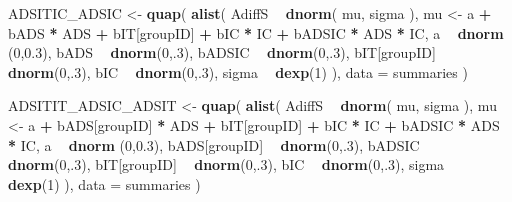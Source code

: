 \documentclass[10pt,dvipsnames,enabledeprecatedfontcommands]{scrartcl}
\newenvironment{Shaded}{\begin{snugshade}}{\end{snugshade}}
\newcommand{\KeywordTok}[1]{\textcolor[rgb]{0.13,0.29,0.53}{\textbf{#1}}}
\newcommand{\DataTypeTok}[1]{\textcolor[rgb]{0.13,0.29,0.53}{#1}}
\newcommand{\DecValTok}[1]{\textcolor[rgb]{0.00,0.00,0.81}{#1}}
\newcommand{\FloatTok}[1]{\textcolor[rgb]{0.00,0.00,0.81}{#1}}
\newcommand{\StringTok}[1]{\textcolor[rgb]{0.31,0.60,0.02}{#1}}
\newcommand{\OperatorTok}[1]{\textcolor[rgb]{0.81,0.36,0.00}{\textbf{#1}}}
\newcommand{\NormalTok}[1]{#1}
\begin{document}
\begin{Shaded}
\begin{Highlighting}[]
\NormalTok{ADSITIC_ADSIC <-}\StringTok{ }\KeywordTok{quap}\NormalTok{(}
  \KeywordTok{alist}\NormalTok{(}
\NormalTok{    AdiffS }\OperatorTok{~}\StringTok{ }\KeywordTok{dnorm}\NormalTok{( mu, sigma ),}
\NormalTok{    mu <-}\StringTok{ }\NormalTok{a }\OperatorTok{+}\StringTok{ }\NormalTok{bADS }\OperatorTok{*}\StringTok{ }\NormalTok{ADS }\OperatorTok{+}\StringTok{  }\NormalTok{bIT[groupID] }\OperatorTok{+}\StringTok{ }\NormalTok{bIC }\OperatorTok{*}\StringTok{ }\NormalTok{IC }\OperatorTok{+}\StringTok{ }\NormalTok{bADSIC }\OperatorTok{*}\StringTok{ }\NormalTok{ADS }\OperatorTok{*}\StringTok{ }\NormalTok{IC,}
\NormalTok{    a }\OperatorTok{~}\StringTok{ }\KeywordTok{dnorm}\NormalTok{ (}\DecValTok{0}\NormalTok{,}\FloatTok{0.3}\NormalTok{),}
\NormalTok{    bADS }\OperatorTok{~}\StringTok{ }\KeywordTok{dnorm}\NormalTok{(}\DecValTok{0}\NormalTok{,.}\DecValTok{3}\NormalTok{),}
\NormalTok{    bADSIC }\OperatorTok{~}\StringTok{ }\KeywordTok{dnorm}\NormalTok{(}\DecValTok{0}\NormalTok{,.}\DecValTok{3}\NormalTok{),}
\NormalTok{    bIT[groupID] }\OperatorTok{~}\StringTok{ }\KeywordTok{dnorm}\NormalTok{(}\DecValTok{0}\NormalTok{,.}\DecValTok{3}\NormalTok{),}
\NormalTok{    bIC }\OperatorTok{~}\StringTok{ }\KeywordTok{dnorm}\NormalTok{(}\DecValTok{0}\NormalTok{,.}\DecValTok{3}\NormalTok{),}
\NormalTok{    sigma  }\OperatorTok{~}\StringTok{ }\KeywordTok{dexp}\NormalTok{(}\DecValTok{1}\NormalTok{)}
\NormalTok{  ), }
  \DataTypeTok{data =}\NormalTok{ summaries}
\NormalTok{)}


\NormalTok{ADSITIT_ADSIC_ADSIT <-}\StringTok{ }\KeywordTok{quap}\NormalTok{(}
  \KeywordTok{alist}\NormalTok{(}
\NormalTok{    AdiffS }\OperatorTok{~}\StringTok{ }\KeywordTok{dnorm}\NormalTok{( mu, sigma ),}
\NormalTok{    mu <-}\StringTok{ }\NormalTok{a }\OperatorTok{+}\StringTok{ }\NormalTok{bADS[groupID] }\OperatorTok{*}\StringTok{ }\NormalTok{ADS }\OperatorTok{+}\StringTok{  }\NormalTok{bIT[groupID] }\OperatorTok{+}\StringTok{ }\NormalTok{bIC }\OperatorTok{*}\StringTok{ }\NormalTok{IC }\OperatorTok{+}\StringTok{ }\NormalTok{bADSIC }\OperatorTok{*}\StringTok{ }\NormalTok{ADS }\OperatorTok{*}\StringTok{ }\NormalTok{IC,}
\NormalTok{    a }\OperatorTok{~}\StringTok{ }\KeywordTok{dnorm}\NormalTok{ (}\DecValTok{0}\NormalTok{,}\FloatTok{0.3}\NormalTok{),}
\NormalTok{    bADS[groupID] }\OperatorTok{~}\StringTok{ }\KeywordTok{dnorm}\NormalTok{(}\DecValTok{0}\NormalTok{,.}\DecValTok{3}\NormalTok{),}
\NormalTok{    bADSIC }\OperatorTok{~}\StringTok{ }\KeywordTok{dnorm}\NormalTok{(}\DecValTok{0}\NormalTok{,.}\DecValTok{3}\NormalTok{),}
\NormalTok{    bIT[groupID] }\OperatorTok{~}\StringTok{ }\KeywordTok{dnorm}\NormalTok{(}\DecValTok{0}\NormalTok{,.}\DecValTok{3}\NormalTok{),}
\NormalTok{    bIC }\OperatorTok{~}\StringTok{ }\KeywordTok{dnorm}\NormalTok{(}\DecValTok{0}\NormalTok{,.}\DecValTok{3}\NormalTok{),}
\NormalTok{    sigma  }\OperatorTok{~}\StringTok{ }\KeywordTok{dexp}\NormalTok{(}\DecValTok{1}\NormalTok{)}
\NormalTok{  ), }
  \DataTypeTok{data =}\NormalTok{ summaries}
\NormalTok{)}



\end{Highlighting}
\end{Shaded}
\end{document}
